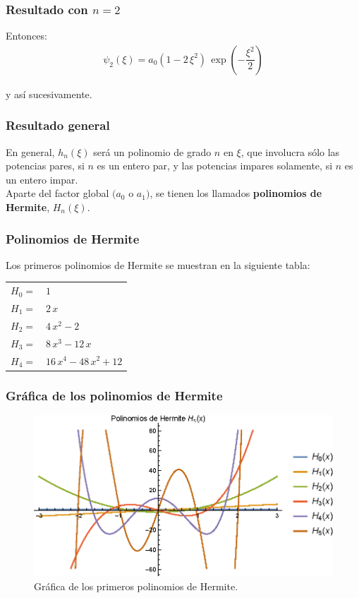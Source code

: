 \documentclass[12pt]{beamer}
\begin{document}
\begin{frame}
\frametitle{Resultado con $n=2$}
Entonces:
\pause
\begin{align*}
\psi_{2} (\xi) = a_{0} (1 - 2 \, \xi^{2}) \, \exp \left( - \dfrac{\xi^{2}}{2} \right)
\end{align*}

y así sucesivamente.
\end{frame}
\begin{frame}
\frametitle{Resultado general}
En general, $h_{n} (\xi)$ será un polinomio de grado $n$ en $\xi$, que involucra sólo las potencias pares, si $n$ es un entero par, y las potencias impares solamente, si $n$ es un entero impar.
\\
\bigskip
\pause
Aparte del factor global $(a_{0}$ o $a_{1})$, se tienen los llamados \textbf{polinomios de Hermite}, $H_{n} (\xi)$.
\end{frame}
\begin{frame}
\frametitle{Polinomios de Hermite}
Los primeros polinomios de Hermite se muestran en la siguiente tabla: %
\begin{table}[H]
\centering
\begin{tabular}{l l}
$H_{0} =$ & $1$ \\
$H_{1} =$ & $2 \, x$ \\
$H_{2} =$ & $4 \, x^{2} - 2 $ \\
$H_{3} =$ & $8 \, x^{3} - 12 \, x$ \\
$H_{4} =$ & $16 \, x^{4} - 48 \, x^{2} + 12 $ %
\end{tabular}
\label{tabla_001}
\end{table}
\end{frame}
\begin{frame}
\frametitle{Gráfica de los polinomios de Hermite}
\begin{figure}[H]
    \centering
    \includegraphics[scale=1]{Imagenes/Plot_Hermite.eps}
    \caption{Gráfica de los primeros polinomios de Hermite.}
    \label{figura_003}
\end{figure}
\end{frame}
\end{document}

